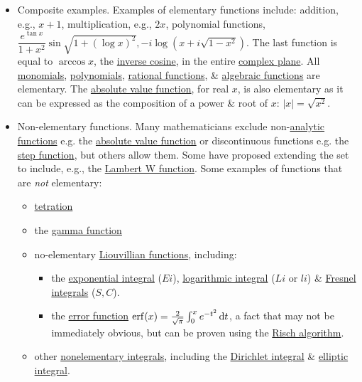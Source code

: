 \documentclass{article}
\begin{document}
\begin{itemize}
	\item {\sf Composite examples.} Examples of elementary functions include: addition, e.g., $x + 1$, multiplication, e.g., $2x$, polynomial functions, $\dfrac{e^{\tan x}}{1 + x^2}\sin\sqrt{1 + (\log x)^2},-i\log\left(x + i\sqrt{1 - x^2}\right)$. The last function is equal to $\arccos x$, the \href{https://en.wikipedia.org/wiki/Inverse_trigonometric_functions#Logarithmic_forms}{inverse cosine}, in the entire \href{https://en.wikipedia.org/wiki/Complex_plane}{complex plane}. All \href{https://en.wikipedia.org/wiki/Monomial}{monomials}, \href{https://en.wikipedia.org/wiki/Polynomial}{polynomials}, \href{https://en.wikipedia.org/wiki/Rational_function}{rational functions}, \& \href{https://en.wikipedia.org/wiki/Algebraic_function}{algebraic functions} are elementary. The \href{https://en.wikipedia.org/wiki/Absolute_value}{absolute value function}, for real $x$, is also elementary as it can be expressed as the composition of a power \& root of $x$: $|x| = \sqrt{x^2}$.
	\item {\sf Non-elementary functions.} Many mathematicians exclude non-\href{https://en.wikipedia.org/wiki/Analytic_function}{analytic functions} e.g. the \href{https://en.wikipedia.org/wiki/Absolute_value}{absolute value function} or discontinuous functions e.g. the \href{https://en.wikipedia.org/wiki/Step_function}{step function}, but others allow them. Some have proposed extending the set to include, e.g., the \href{https://en.wikipedia.org/wiki/Lambert_W_function}{Lambert W function}. Some examples of functions that are {\it not} elementary:
	\begin{itemize}
		\item \href{https://en.wikipedia.org/wiki/Tetration}{tetration}
		\item the \href{https://en.wikipedia.org/wiki/Gamma_function}{gamma function}
		\item no-elementary \href{https://en.wikipedia.org/wiki/Liouvillian_function#Examples}{Liouvillian functions}, including:
		\begin{itemize}
			\item the \href{https://en.wikipedia.org/wiki/Exponential_integral}{exponential integral} ($Ei$), \href{https://en.wikipedia.org/wiki/Logarithmic_integral}{logarithmic integral} ($Li$ or $li$) \& \href{https://en.wikipedia.org/wiki/Fresnel_integral}{Fresnel integrals} ($S,C$).
			\item the \href{https://en.wikipedia.org/wiki/Error_function}{error function} $\operatorname{erf}(x) = \frac{2}{\sqrt{\pi}}\int_0^x e^{-t^2}\,{\rm d}t$, a fact that may not be immediately obvious, but can be proven using the \href{https://en.wikipedia.org/wiki/Risch_algorithm}{Risch algorithm}.
		\end{itemize}
		\item other \href{https://en.wikipedia.org/wiki/Nonelementary_integral}{nonelementary integrals}, including the \href{https://en.wikipedia.org/wiki/Dirichlet_integral}{Dirichlet integral} \& \href{https://en.wikipedia.org/wiki/Elliptic_integral}{elliptic integral}.
	\end{itemize}
\end{itemize}
\end{document}
